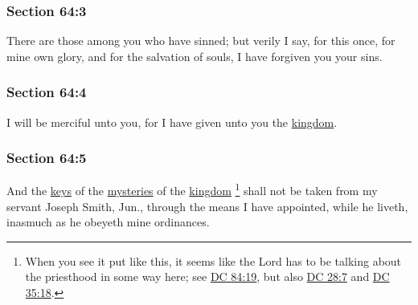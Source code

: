 
	\subsubsection{Section 64:3} %
		\label{DC64-3}

		There are those among you who have sinned; but verily I say, for this once, for mine own glory, and for the salvation of souls, I have forgiven you your sins.


	\subsubsection{Section 64:4} %
		\label{DC64-4}

		I will be merciful unto you, for I have given unto you the \hyperref[KINGDOM]{kingdom}.


	\subsubsection{Section 64:5} %
		\label{DC64-5}

		And the \hyperref[KEY]{keys} of the \hyperref[MYSTERY]{mysteries} of the \hyperref[KINGDOM]{kingdom}%
			\footnote{%
				When you see it put like this, it seems like the Lord has to be talking about the priesthood in some way here; see \hyperref[DC84-19]{DC 84:19}, but also \hyperref[DC28-7]{DC 28:7} and \hyperref[DC35-18]{DC 35:18}.
				}
		shall not be taken from my servant Joseph Smith, Jun., through the means I have appointed, while he liveth, inasmuch as he obeyeth mine ordinances.


